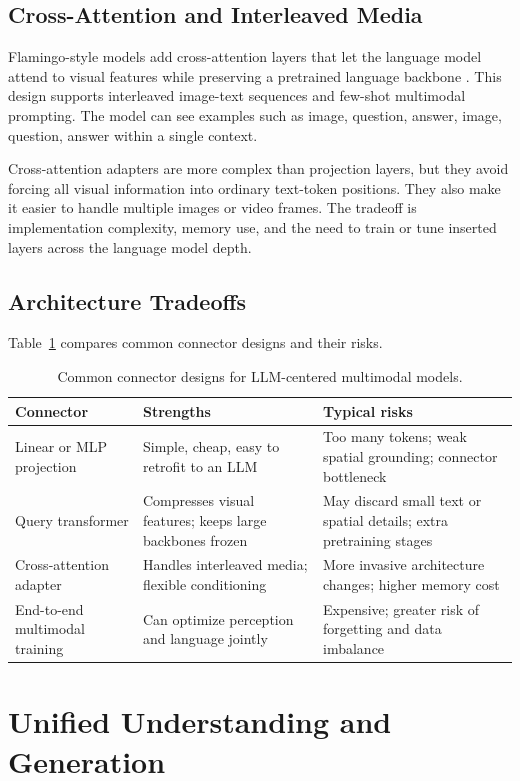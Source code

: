 \subsection{Cross-Attention and Interleaved Media}
Flamingo-style models add cross-attention layers that let the language model attend to visual features while preserving a pretrained language backbone \cite{alayrac2022flamingo}. This design supports interleaved image-text sequences and few-shot multimodal prompting. The model can see examples such as image, question, answer, image, question, answer within a single context.

Cross-attention adapters are more complex than projection layers, but they avoid forcing all visual information into ordinary text-token positions. They also make it easier to handle multiple images or video frames. The tradeoff is implementation complexity, memory use, and the need to train or tune inserted layers across the language model depth.

\subsection{Architecture Tradeoffs}
Table~\ref{tab:vlm-connectors} compares common connector designs and their risks.

\begin{table}[t]
\centering
\begin{tabular}{p{}p{}p{}}
\toprule
Connector & Strengths & Typical risks \\
\midrule
Linear or MLP projection & Simple, cheap, easy to retrofit to an LLM & Too many tokens; weak spatial grounding; connector bottleneck \\
Query transformer & Compresses visual features; keeps large backbones frozen & May discard small text or spatial details; extra pretraining stages \\
Cross-attention adapter & Handles interleaved media; flexible conditioning & More invasive architecture changes; higher memory cost \\
End-to-end multimodal training & Can optimize perception and language jointly & Expensive; greater risk of forgetting and data imbalance \\
\bottomrule
\end{tabular}
\caption{Common connector designs for LLM-centered multimodal models.}
\label{tab:vlm-connectors}
\end{table}

\section{Unified Understanding and Generation}
\label{sec:unified-understanding-generation}

